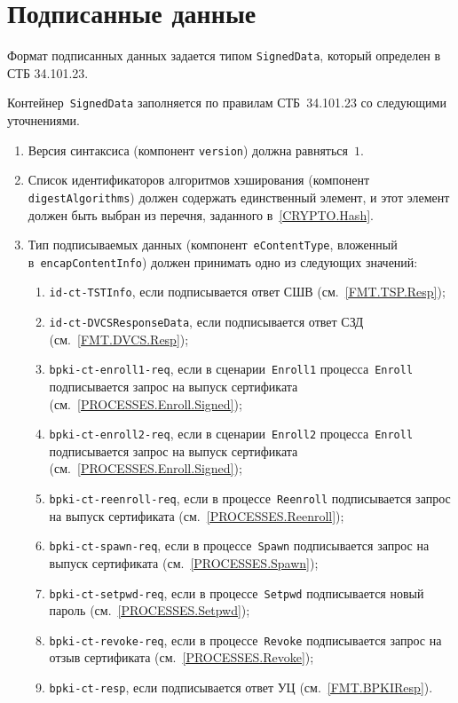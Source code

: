 \section{Подписанные данные}\label{FMT.SignedData}

Формат подписанных данных задается типом \texttt{SignedData}, 
который определен в СТБ 34.101.23. 

Контейнер~\texttt{SignedData} заполняется по правилам СТБ~34.101.23
со следующими уточнениями.

\begin{enumerate}
\item
Версия синтаксиса (компонент \texttt{version}) должна равняться~$1$.

\item
Список идентификаторов алгоритмов хэширования (компонент 
\texttt{digestAlgorithms}) должен содержать единственный элемент, и этот 
элемент должен быть выбран из перечня, заданного в~\ref{CRYPTO.Hash}.

\item
Тип подписываемых данных (компонент~\texttt{eContentType}, вложенный 
в~\texttt{encapContentInfo}) должен принимать одно из следующих значений:

\begin{enumerate}
\item
\texttt{id-ct-TSTInfo}, если подписывается ответ СШВ (см.~\ref{FMT.TSP.Resp});
\item
\texttt{id-ct-DVCSResponseData}, если подписывается ответ СЗД 
(см.~\ref{FMT.DVCS.Resp});
\item
\texttt{bpki-ct-enroll1-req}, если в сценарии~\texttt{Enroll1} 
процесса~\texttt{Enroll} подписывается запрос на выпуск сертификата 
(см.~\ref{PROCESSES.Enroll.Signed}); 
\item
\texttt{bpki-ct-enroll2-req}, если в сценарии~\texttt{Enroll2} 
процесса~\texttt{Enroll} подписывается запрос на выпуск сертификата 
(см.~\ref{PROCESSES.Enroll.Signed}); 
\item
\texttt{bpki-ct-reenroll-req}, если в процессе~\texttt{Reenroll} 
подписывается запрос на выпуск сертификата 
(см.~\ref{PROCESSES.Reenroll}); 
\item
\texttt{bpki-ct-spawn-req}, если в процессе~\texttt{Spawn} 
подписывается запрос на выпуск сертификата 
(см.~\ref{PROCESSES.Spawn}); 
\item
\texttt{bpki-ct-setpwd-req}, если в процессе~\texttt{Setpwd} 
подписывается новый пароль (см.~\ref{PROCESSES.Setpwd}); 
\item
\texttt{bpki-ct-revoke-req}, если в процессе~\texttt{Revoke} 
подписывается запрос на отзыв сертификата (см.~\ref{PROCESSES.Revoke}); 
\item
\texttt{bpki-ct-resp}, если подписывается ответ УЦ 
(см.~\ref{FMT.BPKIResp}).
\end{enumerate}


\end{enumerate}
